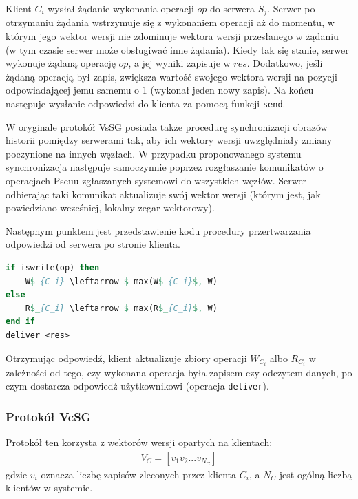 Klient $ C_i $ wysłał żądanie wykonania operacji $ op $ do serwera $ S_j $. Serwer po otrzymaniu żądania wstrzymuje się z wykonaniem operacji aż do momentu, w którym jego wektor wersji nie zdominuje wektora wersji przesłanego w żądaniu (w tym czasie serwer może obsługiwać inne żądania). Kiedy tak się stanie, serwer wykonuje żądaną operację $ op $, a jej wyniki zapisuje w $ res $. Dodatkowo, jeśli żądaną operacją był zapis, zwiększa wartość swojego wektora wersji na pozycji odpowiadającej jemu samemu o 1 (wykonał jeden nowy zapis). Na końcu następuje wysłanie odpowiedzi do klienta za pomocą funkcji \texttt{send}.

W oryginale protokół VsSG posiada także procedurę synchronizacji obrazów historii pomiędzy serwerami tak, aby ich wektory wersji uwzględniały zmiany poczynione na innych węzłach. W przypadku proponowanego systemu synchronizacja następuje samoczynnie poprzez rozgłaszanie komunikatów o operacjach  Pseuu zgłaszanych systemowi do wszystkich węzłów. Serwer odbierając taki komunikat aktualizuje swój wektor wersji (którym jest, jak powiedziano wcześniej, lokalny zegar wektorowy).

Następnym punktem jest przedstawienie kodu procedury przertwarzania odpowiedzi od serwera po stronie klienta.

\begin{lstlisting}[language=Pascal, caption=Pseudokod procedury obsługi odpowiedzi od serwera po stronie klienta w protokole VsSG, mathescape=true]
if iswrite(op) then
    W$_{C_i} \leftarrow $ max(W$_{C_i}$, W)
else
    R$_{C_i} \leftarrow $ max(R$_{C_i}$, W)
end if
deliver <res>
\end{lstlisting}

Otrzymując odpowiedź, klient aktualizuje zbiory operacji $ W_{C_i} $ albo $ R_{C_i} $ w zależności od tego, czy wykonana operacja była zapisem czy odczytem danych, po czym dostarcza odpowiedź użytkownikowi (operacja \texttt{deliver}).

\subsubsection{Protokół VcSG}

Protokół ten korzysta z wektorów wersji opartych na klientach:
\begin{align*}
    V_C = [v_1 v_2 ... v_{N_C}]    
\end{align*}
gdzie $ v_i $ oznacza liczbę zapisów zleconych przez klienta $ C_i $, a $ N_C $ jest ogólną liczbą klientów w systemie.

